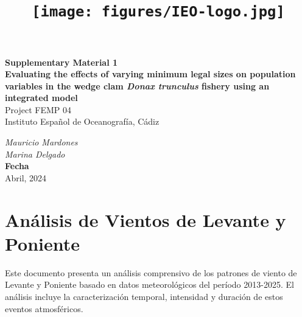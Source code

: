 \documentclass[
]{article}
\title{\texttt{[image: figures/IEO-logo.jpg]}}
\author{}
\date{\vspace{-2.5em}}
\begin{document}
\maketitle



\begin{flushleft}
\Large{\textbf{Supplementary Material 1}}\\
\vspace*{2\baselineskip}
\LARGE{\textbf{Evaluating the effects of varying minimum legal sizes on population variables in the wedge clam \textit{Donax trunculus} fishery using an integrated model}}\\
\vspace*{5\baselineskip}
\Large{Project FEMP 04}\\
\vspace*{1\baselineskip}
\Large{Instituto Español de Oceanografía, Cádiz }\\
\vspace*{4\baselineskip}
\end{flushleft}
\begin{flushright}
\large{\textit{Mauricio Mardones}}\\
\large{\textit{Marina Delgado}}\\
\vspace*{1\baselineskip}
\normalsize{\textbf{Fecha}}\\
Abril, 2024
\end{flushright}



\hypersetup{linkcolor = black}
\newpage
{}

\newpage



\hypersetup{linkcolor = blue}

{
\hypersetup{linkcolor=}
\setcounter{tocdepth}{3}
\tableofcontents
}
\pagebreak

\section{Análisis de Vientos de Levante y Poniente}\label{anuxe1lisis-de-vientos-de-levante-y-poniente}

Este documento presenta un análisis comprensivo de los patrones de viento de Levante y Poniente basado en datos meteorológicos del período 2013-2025. El análisis incluye la caracterización temporal, intensidad y duración de estos eventos atmosféricos.
\end{document}
